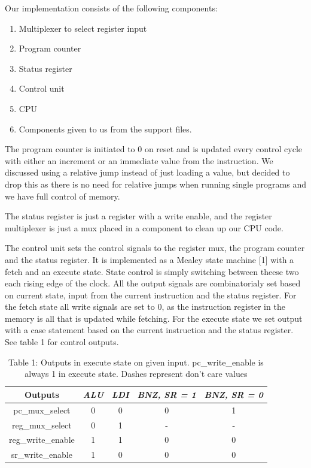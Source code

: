 \documentclass[10pt]{report}
\begin{document}
Our implementation consists of the following components:
	
\begin{enumerate}
\item Multiplexer to select register input
\item Program counter
\item Status register
\item Control unit
\item CPU
\item Components given to us from the support files.
\end{enumerate}
	
The program counter is initiated to 0 on reset and is updated every control cycle
with either an increment or an immediate value from the instruction. 
We discussed using a relative jump instead of just loading a value, 
but decided to drop this as there is no need for relative jumps when running single programs
and we have full control of memory.
  
The status register is just a register with a write enable, and the register multiplexer is 
just a mux placed in a component to clean up our CPU code.  

The control unit sets the control signals to the register mux, the program counter 
and the status register. It is implemented as a Mealey state machine [1]
with a fetch and an execute state. State control is simply switching between theese two
each rising edge of the clock. All the output signals are combinatorialy set based on current
state, input from the current instruction and the status register. For the fetch state all
write signals are set to 0, as the instruction register in the memory is all that is updated
while fetching. For the execute state we set output with a case statement based on the current 
instruction and the status register. See table 1 for control outputs.

\begin{table}[h]
  \centering
  \begin{tabular}{|c|c|c|c|c|} \hline
    Outputs&\emph{ALU}&\emph{LDI}&\emph{BNZ, SR = 1}&\emph{BNZ, SR = 0}\\ \hline
    pc\_mux\_select&0&0&0&1  \\
    reg\_mux\_select&0&1&-&-  \\
    reg\_write\_enable&1&1&0&0  \\
    sr\_write\_enable&1&0&0&0  \\
    \hline
  \end{tabular}
  \caption{Table 1: Outputs in execute state on given input.
  pc\_write\_enable is always 1 in execute state. Dashes represent don't care values}
\end{table}
\end{document}
